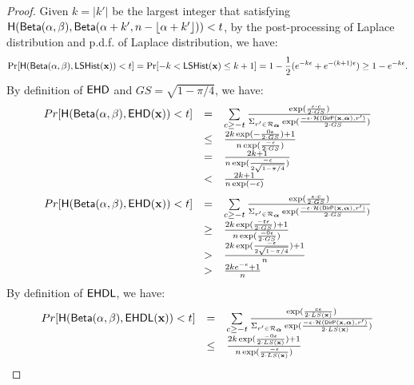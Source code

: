 \documentclass{article}
\begin{document}
\begin{proof}
Given $k = |k'|$ be the largest integer that satisfying $\mathsf{H}(\mathsf{Beta}(\alpha, \beta), \mathsf{Beta}(\alpha + k', n - \lfloor \alpha + k' \rfloor)) < t$, by the post-processing of Laplace distribution
and p.d.f. of Laplace distribution, we have:
%
\[
	\Pr[\mathsf{H}(\mathsf{Beta}(\alpha, \beta), \mathsf{LSHist}(\textbf{x}))< t]
	= \Pr[-k < \mathsf{LSHist}(\textbf{x}) \leq k + 1] 
	= 1 - \frac{1}{2}(e^{-k\epsilon} + e^{-(k + 1)\epsilon})
  \geq 1 - e^{-k\epsilon}.
\]
%
%
By definition of $\mathsf{EHD}$ and $GS = \sqrt{1 - \pi/4}$, we have:
%
%
\[
	\begin{array}{lcl}
	Pr[\mathsf{H}(\mathsf{Beta}(\alpha, \beta), \mathsf{EHD}(\textbf{x})) < t] 
	& =  & \sum\limits_{c \geq - t}
	\frac
  {\exp(\frac{\epsilon\cdot c}{2\cdot GS})}
{\Sigma_{r' \in \mathcal{R}_{\boldsymbol{\alpha}}}\exp(\frac{-\epsilon\cdot \mathcal{H}(\mathsf{DirP}(\textbf{x},\boldsymbol{\alpha}), r')}{2\cdot GS})}\\
 	& \leq &
 	\frac
  	{2k\exp(-\frac{0\epsilon }{2\cdot GS}) + 1}
	{n\exp(\frac{-\epsilon }{2\cdot GS})}\\
 	& = &
 	\frac
  	{2k + 1}
	{n\exp(\frac{-\epsilon }{2\sqrt{1 - \pi/4}})}\\
	& < & 
 	\frac
  	{2k + 1}
	{n\exp(-\epsilon)}
\end{array}
\]
\[
	\begin{array}{lcl}
	Pr[\mathsf{H}(\mathsf{Beta}(\alpha, \beta), \mathsf{EHD}(\textbf{x})) < t] 
	& =  & \sum\limits_{c \geq - t}
	\frac
  	{\exp(\frac{\epsilon\cdot c}{2\cdot GS})}
	{\Sigma_{r' \in \mathcal{R}_{\boldsymbol{\alpha}}}\exp(\frac{-\epsilon\cdot \mathcal{H}(\mathsf{DirP}(\textbf{x},\boldsymbol{\alpha}), r')}{2\cdot GS})}\\
 	& \geq &
 	\frac
  	{2k\exp(\frac{-t\epsilon }{2\cdot GS}) + 1}
	{n\exp(\frac{-0\epsilon }{2\cdot GS})}\\
 	& > &
 	\frac
  	{2k\exp(\frac{-\epsilon }{2\sqrt{1 - \pi/4}}) + 1}
	{n}\\
	& > & 
 	\frac
  	{2ke^{-\epsilon} + 1}{n}
\end{array}
\]
%
%
By definition of $\mathsf{EHDL}$, we have:
%
%
\[
	\begin{array}{lcl}
	Pr[\mathsf{H}(\mathsf{Beta}(\alpha, \beta), \mathsf{EHDL}(\textbf{x})) < t] 
	& =  & \sum\limits_{c \geq - t}
	\frac
  	{\exp(\frac{c\epsilon}{2\cdot LS(\textbf{x})})}
	{\Sigma_{r' \in \mathcal{R}_{\boldsymbol{\alpha}}}\exp(\frac{-\epsilon\cdot \mathcal{H}(\mathsf{DirP}(\textbf{x},\boldsymbol{\alpha}), r')}{2\cdot LS(\textbf{x})})}\\
 	& \leq &
 	\frac
  	{2k\exp(\frac{-0\epsilon }{2\cdot LS(\textbf{x})}) + 1}
	{n\exp(\frac{-\epsilon }{2\cdot LS(\textbf{x})})}\\

\end{array}\]
\end{proof}
\end{document}
